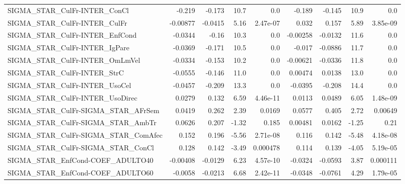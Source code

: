 \begin{tabular}{lrrrrrrrr}
SIGMA\_STAR\_CulFr-INTER\_ConCl           &      -0.219 &       -0.173 &     10.7 &      0.0 &     -0.189 &      -0.145 &         10.9 &           0.0 \\
SIGMA\_STAR\_CulFr-INTER\_CulFr           &    -0.00877 &      -0.0415 &     5.16 & 2.47e-07 &      0.032 &       0.157 &         5.89 &      3.85e-09 \\
SIGMA\_STAR\_CulFr-INTER\_EnfCond         &     -0.0344 &        -0.16 &     10.3 &      0.0 &   -0.00258 &     -0.0132 &         11.6 &           0.0 \\
SIGMA\_STAR\_CulFr-INTER\_IgPare          &     -0.0369 &       -0.171 &     10.5 &      0.0 &     -0.017 &     -0.0886 &         11.7 &           0.0 \\
SIGMA\_STAR\_CulFr-INTER\_OmLmVel         &     -0.0334 &       -0.153 &     10.2 &      0.0 &   -0.00621 &     -0.0336 &         11.8 &           0.0 \\
SIGMA\_STAR\_CulFr-INTER\_StrC            &     -0.0555 &       -0.146 &     11.0 &      0.0 &    0.00474 &      0.0138 &         13.0 &           0.0 \\
SIGMA\_STAR\_CulFr-INTER\_UsoCel          &     -0.0457 &       -0.209 &     13.3 &      0.0 &    -0.0395 &      -0.208 &         14.4 &           0.0 \\
SIGMA\_STAR\_CulFr-INTER\_UsoDirec        &      0.0279 &        0.132 &     6.59 & 4.46e-11 &     0.0113 &      0.0489 &         6.05 &      1.48e-09 \\
SIGMA\_STAR\_CulFr-SIGMA\_STAR\_AFrSem     &      0.0419 &        0.262 &     2.39 &   0.0169 &     0.0577 &       0.405 &         2.72 &       0.00649 \\
SIGMA\_STAR\_CulFr-SIGMA\_STAR\_AmbTr      &      0.0626 &        0.207 &    -1.32 &    0.185 &    0.00481 &      0.0162 &        -1.25 &          0.21 \\
SIGMA\_STAR\_CulFr-SIGMA\_STAR\_ComAfec    &       0.152 &        0.196 &    -5.56 & 2.71e-08 &      0.116 &       0.142 &        -5.48 &      4.18e-08 \\
SIGMA\_STAR\_CulFr-SIGMA\_STAR\_ConCl      &       0.128 &        0.142 &    -3.49 & 0.000478 &      0.114 &       0.139 &        -4.05 &      5.19e-05 \\
SIGMA\_STAR\_EnfCond-COEF\_ADULTO40       &    -0.00408 &      -0.0129 &     6.23 & 4.57e-10 &    -0.0324 &     -0.0593 &         3.87 &      0.000111 \\
SIGMA\_STAR\_EnfCond-COEF\_ADULTO60       &     -0.0058 &      -0.0213 &     6.68 & 2.42e-11 &    -0.0348 &     -0.0761 &         4.29 &      1.79e-05 \\

\end{tabular}
